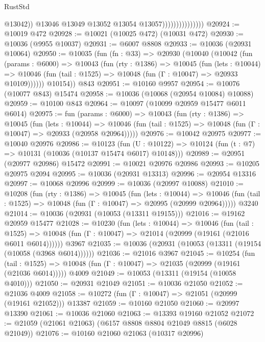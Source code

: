\begin{lexlean}{RustStd}
\begin{coremodule}
{{                                      @13042))
                                  @13046
                                  @13049
                                  @13052
                                  @13054
                                  @13057)))))))))))))))
@20924 := @10019 @472
@20928 := @10021 (@10025 @472) (@10031 @472)
@20930 := @10036 (@9955 @10037)
@20931 := @6007 @8808
@20933 := @10036 (@20931 @10064)
@20950 := @10035
    (fun (fn : @33) =>
    @20930
      (@10040
        (@10042
          (fun (params : @6000) =>
          @10043
            (fun (rty : @1386) =>
            @10045
              (fun (lets : @10044) =>
              @10046 (fun (tail : @1525) => @10048 (fun (Γ : @10047) => @20933 @10109))))))
        @10154))
    @843
@20951 := @10160 @9957
@20954 := @10076 (@10077 @843) @15474
@20958 := @10036 (@10068 (@20954 @10084) @10088)
@20959 := @10100 @843
@20964 := @10097 (@10099 @20959 @15477 @6011 @6014)
@20975 := fun (params : @6000) =>
  @10043
    (fun (rty : @1386) =>
    @10045
      (fun (lets : @10044) =>
      @10046 (fun (tail : @1525) => @10048 (fun (Γ : @10047) => @20933 (@20958 @20964)))))
@20976 := @10042 @20975
@20977 := @10040 @20976
@20986 := @10123
    (fun (U : @10122) => @10124 (fun (t : @7) => @10131 (@10036 (@10137 @15474 @6017) @10148)))
@20989 := @20951 (@20977 @20986) @15472
@20991 := @10021 @20976 @20986
@20993 := @10205 @20975 @2094
@20995 := @10036 (@20931 @13313)
@20996 := @20954 @13316
@20997 := @10068 @20996
@20999 := @10036 (@20997 @10088)
@21010 := @10208
    (fun (rty : @1386) =>
    @10045
      (fun (lets : @10044) =>
      @10046 (fun (tail : @1525) => @10048 (fun (Γ : @10047) => @20995 (@20999 @20964)))))
    @3240
@21014 := @10036 (@20931 (@10053 (@13311 @19155)))
@21016 := @19162 @20959 @15477
@21028 := @10230
    (fun (lets : @10044) =>
    @10046
      (fun (tail : @1525) =>
      @10048 (fun (Γ : @10047) => @21014 (@20999 (@19161 (@21016 @6011 @6014))))))
    @3967
@21035 := @10036 (@20931 (@10053 (@13311 (@19154 (@10058 (@3968 @6014))))))
@21036 := @21016 @3967
@21045 := @10254
    (fun (tail : @1525) => @10048 (fun (Γ : @10047) => @21035 (@20999 (@19161 (@21036 @6014)))))
    @4009
@21049 := @10053 (@13311 (@19154 (@10058 @4010)))
@21050 := @20931 @21049
@21051 := @10036 @21050
@21052 := @21036 @4009
@21058 := @10272 (fun (Γ : @10047) => @21051 (@20999 (@19161 @21052))) @13387
@21059 := @10160 @21050
@21060 := @20997 @13390
@21061 := @10036 @21060
@21063 := @13393 @19160 @21052
@21072 := @21059 (@21061 @21063) (@6157 @8808 @8804 @21049 @8815 (@6028 @21049))
@21076 := @10160 @21060 @21063 (@10317 @20996)
}}
\end{coremodule}
\end{lexlean}
